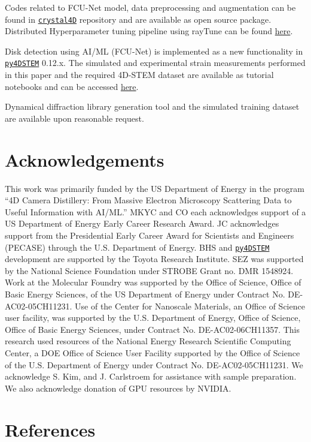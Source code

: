 \documentclass[%
 reprint,
superscriptaddress,
 amsmath,
 amssymb,
 prl,
]{revtex4-2}
\newcommand{\pyFDSTEM}{\href{https://github.com/py4dstem/py4DSTEM}{\texttt{py4DSTEM}}}
\newcommand{\crystalFD}{\href{https://github.com/AI-ML-4DSTEM/crystal4D/tree/dev}{\texttt{crystal4D}}}
\begin{document}
 Codes related to FCU-Net model, data preprocessing and augmentation can be found in \crystalFD{} repository and are available as open source package. Distributed Hyperparameter tuning pipeline using rayTune can be found \href{https://github.com/AI-ML-4DSTEM/4D-OPTIMIZE/tree/nersc_ray}{here}.
 
 Disk detection using AI/ML (FCU-Net) is implemented as a new functionality in \pyFDSTEM{} 0.12.x. The simulated and experimental strain measurements performed in this paper and the required 4D-STEM dataset are available as tutorial notebooks and can be accessed \href{https://github.com/py4dstem/py4DSTEM_tutorials/tree/main/notebooks/strain_aiml}{here}.
 
 Dynamical diffraction library generation tool and the simulated training dataset are available upon reasonable request.


\section*{Acknowledgements}

This work was primarily funded by the US Department of Energy in the program ``4D Camera Distillery: From Massive Electron Microscopy Scattering Data to Useful Information with AI/ML.''  MKYC and CO each acknowledges support of a US Department of Energy Early Career Research Award. JC acknowledges support from the Presidential Early Career Award for Scientists and Engineers (PECASE) through the U.S. Department of Energy. BHS and \pyFDSTEM{} development are supported by the Toyota Research Institute. SEZ was supported by the National Science Foundation under STROBE Grant no. DMR 1548924. Work at the Molecular Foundry was supported by the Office of Science, Office of Basic Energy Sciences, of the US Department of Energy under Contract No. DE-AC02-05CH11231. Use of the Center for Nanoscale Materials, an Office of Science user facility, was supported by the U.S. Department of Energy, Office of Science, Office of Basic Energy Sciences, under Contract No. DE-AC02-06CH11357. This research used resources of the National Energy Research Scientific Computing Center, a DOE Office of Science User Facility supported by the Office of Science of the U.S. Department of Energy under Contract No. DE-AC02-05CH11231. We acknowledge S. Kim, and J. Carlstroem for assistance with sample preparation.  We also acknowledge donation of GPU resources by NVIDIA.


\section*{References}


\end{document}
